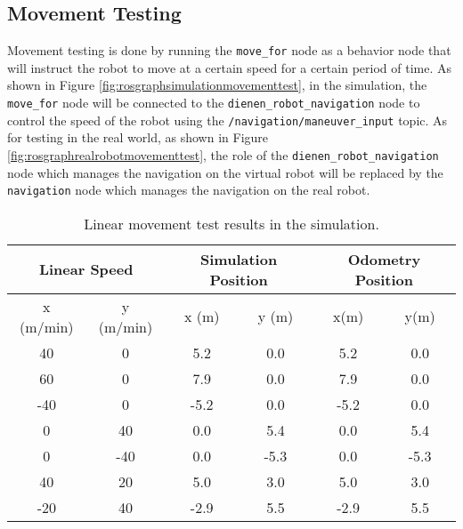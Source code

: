 \subsection{Movement Testing}
\label{subsec:movementtesting}




Movement testing is done by running the \lstinline{move_for} node as a behavior node that will instruct the robot to move at a certain speed for a certain period of time.
As shown in Figure \ref{fig:rosgraphsimulationmovementtest},
  in the simulation,
  the \lstinline{move_for} node will be connected to the \lstinline{dienen_robot_navigation} node to control the speed of the robot using the \lstinline{/navigation/maneuver_input} topic.
As for testing in the real world, as shown in Figure \ref{fig:rosgraphrealrobotmovementtest},
  the role of the \lstinline{dienen_robot_navigation} node which manages the navigation on the virtual robot will be replaced by the \lstinline{navigation} node which manages the navigation on the real robot.

\begin{table}
  \caption{Linear movement test results in the simulation.}
  \label{tab:simulationlineartestresults}
  \centering
  \begin{tabular}{cc|cc|cc}
    \toprule
    \multicolumn{2}{c|}{Linear Speed} &
    \multicolumn{2}{|c|}{Simulation Position} &
    \multicolumn{2}{|c}{Odometry Position} \\
    \midrule
    x (m/min) & y (m/min) & x (m) & y (m) & x(m)  & y(m) \\
    \midrule
    40        & 0         & 5.2   & 0.0   & 5.2   & 0.0 \\
    60        & 0         & 7.9   & 0.0   & 7.9   & 0.0 \\
    -40       & 0         & -5.2  & 0.0   & -5.2  & 0.0 \\
    0         & 40        & 0.0   & 5.4   & 0.0   & 5.4 \\
    0         & -40       & 0.0   & -5.3  & 0.0   & -5.3 \\
    40        & 20        & 5.0   & 3.0   & 5.0   & 3.0 \\
    -20       & 40        & -2.9  & 5.5   & -2.9  & 5.5 \\
    \bottomrule
  \end{tabular}
\end{table}

